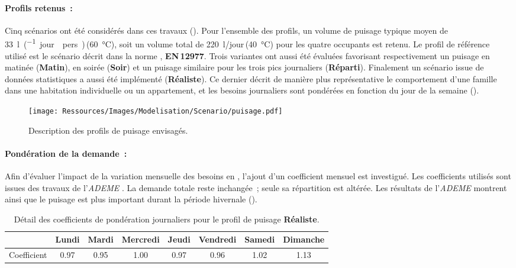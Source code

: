 \paragraph{Profils retenus~:} %
\label{par:profils_retenus}
Cinq scénarios ont été considérés dans ces travaux ().
Pour l’ensemble des profils, un volume de puisage typique moyen de
\SI{33}{\litre\per(jour\period pers)}\,(\SI{60}{\celsius}), soit un
volume total de \SI{220}{\litre/jour}\,(\SI{40}{\celsius}) pour les quatre occupants est
retenu. Le profil de référence utilisé est le scénario décrit dans la norme
\textcite{EN129771}, \textbf{EN\,12977}. Trois variantes ont aussi été évaluées favorisant
respectivement un puisage en matinée (\textbf{Matin}), en soirée (\textbf{Soir}) et un
puisage similaire pour les trois pics journaliers (\textbf{Réparti}). Finalement un scénario
issue de données statistiques \parencite{ADEME2016} a aussi été implémenté
(\textbf{Réaliste}). Ce dernier décrit de manière plus représentative le comportement
d’une famille dans une habitation individuelle ou un appartement, et les besoins
journaliers sont pondérées en fonction du jour de la semaine ().
\begin{figure}
    \centering
    \texttt{[image: Ressources/Images/Modelisation/Scenario/puisage.pdf]}
    \caption[Description des profils de puisage envisagés]
            {Description des profils de puisage envisagés.}
    \label{fig:profil_puisage}
\end{figure}

\paragraph{Pondération de la demande~:} %
\label{par:ponderation_de_la_demande}
Afin d’évaluer l’impact de la variation mensuelle des besoins en , l’ajout d’un
coefficient mensuel est investigué. Les coefficients utilisés sont issues des travaux de
l’\textit{ADEME} \parencite{ADEME2016}. La demande totale reste inchangée~; seule sa
répartition est altérée. Les résultats de l’\textit{ADEME} montrent ainsi que le puisage est plus
important durant la période hivernale ().

\begin{table}
\centering
\caption[Détail des coefficients de pondération journaliers pour le profil de puisage Réaliste]
        {Détail des coefficients de pondération journaliers pour le profil de
         puisage \textbf{Réaliste}.}
\label{tab:coef_semaine}
\begin{tabular}{l*{7}{c}}
    \toprule
                & Lundi & Mardi & Mercredi & Jeudi & Vendredi & Samedi & Dimanche \\
    \midrule
    Coefficient & \num{0.97}  & \num{0.95}  & \num{1.00}     & \num{0.97}  & \num{0.96}     & \num{1.02}   & \num{1.13}     \\
    \bottomrule
\end{tabular}
\end{table}

